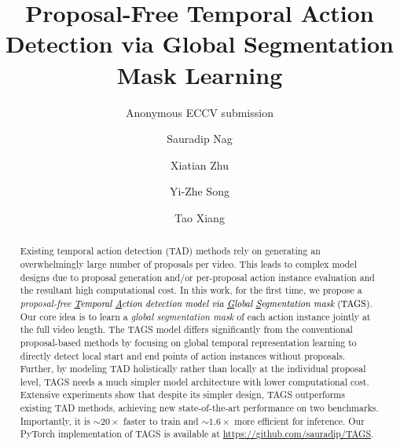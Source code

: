 \documentclass[runningheads]{llncs}
\newcommand{\shortmodelname}{TAGS}
\begin{document}
\pagestyle{headings}
\mainmatter
\def\ECCVSubNumber{100}  

\title{Proposal-Free Temporal Action Detection via Global Segmentation Mask Learning} 

\author{Anonymous ECCV submission}


\author{Sauradip Nag \and
Xiatian Zhu \and
Yi-Zhe Song \and
Tao Xiang}
\maketitle

\begin{abstract}
Existing temporal action detection (TAD) methods 
rely on generating an overwhelmingly large number of proposals per video. This leads to  complex model designs due to proposal generation and/or per-proposal action instance evaluation and the resultant high computational cost. In this work, for the first time, we propose a  {\em proposal-free} \textcolor{black}{{\em \underline{T}emporal  \underline{A}ction detection model via \underline{G}lobal \underline{S}egmentation mask} (\shortmodelname)}.  Our core idea is to learn a  {\em global segmentation mask} of each action instance jointly at the full video length.  The {\shortmodelname} model differs significantly from the conventional proposal-based methods by focusing on global temporal representation learning to directly detect local start and end points of action instances without proposals. Further, by modeling TAD holistically rather than locally at the individual proposal level,
{\shortmodelname} needs a much simpler model architecture with lower computational cost.
Extensive experiments show that despite its simpler design, {\shortmodelname}  outperforms existing TAD methods, achieving new state-of-the-art performance on two benchmarks. Importantly, it is  $\sim{20\times}$ faster to train and  $\sim{1.6\times}$ more efficient for inference. Our PyTorch implementation of {\shortmodelname} is available at \href{https://github.com/sauradip/TAGS}{https://github.com/sauradip/TAGS}.
\end{abstract}
\end{document}

